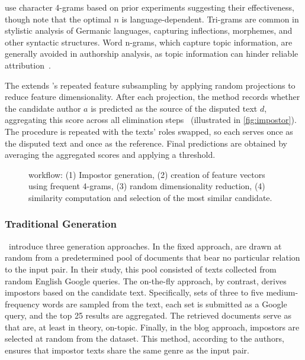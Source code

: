 \citet{koppel_determining_2014} use character 4-grams based on prior experiments suggesting their effectiveness, though \citet{neal_surveying_2018} note that the optimal $n$ is language-dependent. 
Tri-grams are common in stylistic analysis of Germanic languages, capturing inflections, %
morphemes, %
and other syntactic structures. 
Word n-grams, which capture topic information, are generally avoided in authorship analysis, as topic information can hinder reliable attribution~\citep{neal_surveying_2018,Sapkota_ngrams_2015}.

The \impAppr{} extends \unmasking{}'s repeated feature subsampling \citep{koppel_authorship_2004} by applying random projections to reduce feature dimensionality.
After each projection, the method records whether the candidate author $a$ is predicted as the source of the disputed text $d$, aggregating this score across all elimination steps~\citep{tyo_state_2022} (illustrated in \autoref{fig:impostor}). 
The procedure is repeated with the texts' roles swapped, so each serves once as the disputed text and once as the reference. 
Final predictions are obtained by averaging the aggregated scores and applying a threshold.

\begin{figure}[htbp]
    \centering
    
    \caption[\impAppr{} workflow.]{\impAppr{} workflow: (1) Impostor generation, (2) creation of feature vectors using frequent 4-grams, (3) random dimensionality reduction, (4) similarity computation and selection of the most similar candidate.}
    \label{fig:impostor}
\end{figure}


\subsubsection{Traditional \Imp{} Generation}
\label{subsubsec:traditional_impostor_generation}

\citet{koppel_determining_2014}\ introduce three \imp{} generation approaches. 
In the fixed approach, \imps{} are drawn at random from a predetermined pool of documents that bear no particular relation to the input pair.
In their study, this pool consisted of texts collected from random English Google queries. 
The on-the-fly approach, by contrast, derives impostors based on the candidate text. 
Specifically, sets of three to five medium-frequency words are sampled from the text, each set is submitted as a Google query, and the top 25 results are aggregated. 
The retrieved documents serve as \imps{} that are, at least in theory, on-topic. 
Finally, in the blog approach, impostors are selected at random from the \dataBlog{} dataset. 
This method, according to the authors, ensures that impostor texts share the same genre as the input pair.

